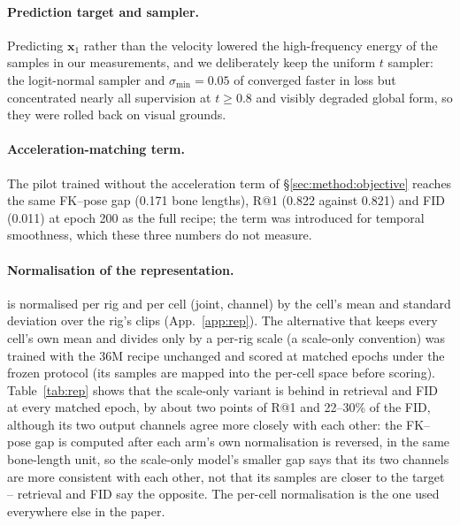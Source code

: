 \paragraph{Prediction target and sampler.} Predicting
$\mathbf{x}_1$ rather than the velocity lowered the high-frequency energy of the samples in our
measurements, and we deliberately keep the uniform $t$ sampler: the logit-normal sampler and $\sigma_{\min}{=}0.05$ of \citet{li2025jit} converged
faster in loss but concentrated nearly all supervision at $t\ge0.8$ and visibly degraded global
form, so they were rolled back on visual grounds.

\paragraph{Acceleration-matching term.} The pilot trained without the acceleration term of
\S\ref{sec:method:objective} reaches the same FK--pose gap (\num{0.171} bone lengths), R@1 (\num{0.822}
against \num{0.821}) and FID (\num{0.011}) at epoch 200 as the full recipe; the term was introduced
for temporal smoothness, which these three numbers do not measure.

\paragraph{Normalisation of the representation.} \rep{} is normalised per rig and per cell (joint,
channel) by the cell's mean and standard deviation over the rig's clips (App.~\ref{app:rep}). The
alternative that keeps every cell's own mean and divides only by a per-rig scale (a scale-only
convention) was trained with the \num{36}M recipe unchanged and scored at matched epochs under the
frozen protocol (its samples are mapped into the per-cell space before scoring). Table~\ref{tab:rep}
shows that the scale-only variant is behind in retrieval and FID at every matched epoch, by about two
points of R@1 and \num{22}--\num{30}\% of the FID, although its two output channels agree more closely with each
other: the FK--pose gap is computed after each arm's own normalisation is reversed, in the same bone-length
unit, so the scale-only model's smaller gap says that its two channels are more consistent with each
other, not that its samples are closer to the target -- retrieval and FID say the opposite. The
per-cell normalisation is the one used everywhere else in the paper.

